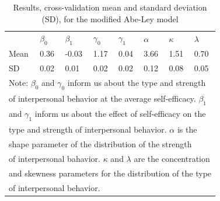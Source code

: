 \documentclass[man,mask]{apa6}
\begin{document}
\begin{table}
\begin{tabular}[t]{lllllll}
\end{tabular}
\end{table}

\begin{table}

\caption{\label{tab:estAL}Results, cross-validation mean and standard deviation (SD), for the modified Abe-Ley model}
\centering
\begin{tabular}[t]{llllllll}
\toprule
& $\beta_0$ & $\beta_1$ & $\gamma_0$  & $\gamma_1$ & $\alpha$ & $\kappa$ & $\lambda$\\
Mean & 0.36 & -0.03 & 1.17 & 0.04 & 3.66 & 1.51 & 0.70 \\
SD & 0.02 & 0.01 & 0.02 & 0.02 & 0.12 & 0.08 & 0.05\\
\bottomrule
\multicolumn{8}{l}{Note: $\beta_0$  and $\gamma_0$ inform us about the type and strength }\\
\multicolumn{8}{l}{of interpersonal behavior at the average self-efficacy. $\beta_1$ }\\
\multicolumn{8}{l}{and $\gamma_1$ inform us about the effect of self-efficacy on the}\\
\multicolumn{8}{l}{type and strength of interpersonal behavior. $\alpha$ is the } \\
\multicolumn{8}{l}{shape parameter of the distribution of the strength }\\
\multicolumn{8}{l}{of interpersonal bahavior. $\kappa$ and $\lambda$ are the concentration}\\
\multicolumn{8}{l}{and skewness parameters for the distribution of the type}\\
\multicolumn{8}{l}{of interpersonal behavior.}\\
\end{tabular}
\end{table}
\end{document}
